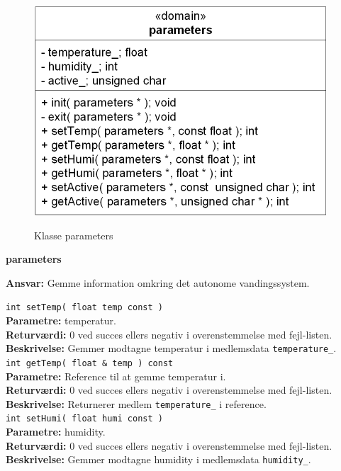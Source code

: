 
\begin{figure}[htbp] \centering
{\includegraphics[scale=1.3]{filer/design/Klassediagrammer/sw_psoc_parameters}}
\caption{Klasse parameters}
\label{fig:sw_psoc_class_parameters}
\end{figure} 

{\centering
\textbf{parameters}\par
}
\textbf{Ansvar:} Gemme information omkring det autonome vandingssystem. \

\verb+int setTemp( float temp const ) +\\
\textbf{Parametre:} temperatur. \\
\textbf{Returværdi:} 0 ved succes ellers negativ i overenstemmelse med fejl-listen. \\
\textbf{Beskrivelse:} Gemmer modtagne temperatur i medlemsdata \verb+temperature_+. \\

\verb+int getTemp( float & temp ) const+ \\
\textbf{Parametre:} Reference til at gemme temperatur i. \\
\textbf{Returværdi:} 0 ved succes ellers negativ i overenstemmelse med fejl-listen. \\
\textbf{Beskrivelse:} Returnerer medlem \verb+temperature_+ i reference. \\

\verb+int setHumi( float humi const )+ \\
\textbf{Parametre:} humidity. \\
\textbf{Returværdi:} 0 ved succes ellers negativ i overenstemmelse med fejl-listen. \\
\textbf{Beskrivelse:} Gemmer modtagne humidity i medlemsdata \verb+humidity_+. \\


